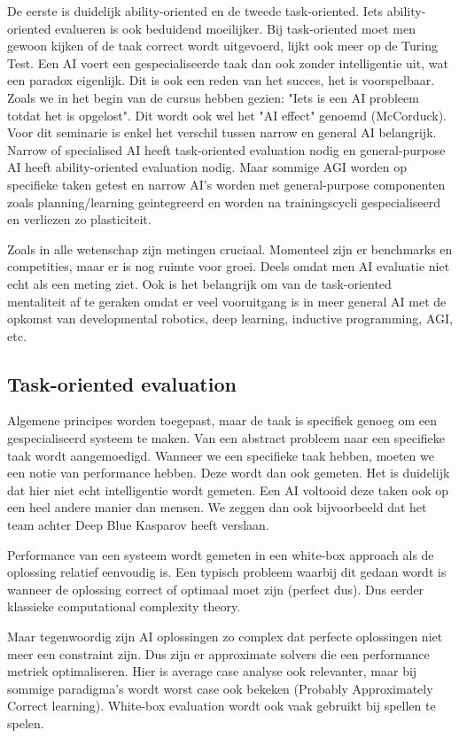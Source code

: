 \documentclass[11pt]{article}
\begin{document}
De eerste is duidelijk ability-oriented en de tweede task-oriented. Iets ability-oriented evalueren is ook beduidend moeilijker. Bij task-oriented moet men gewoon kijken of de taak correct wordt uitgevoerd, lijkt ook meer op de Turing Test. Een AI voert een gespecialiseerde taak dan ook zonder intelligentie uit, wat een paradox eigenlijk. Dit is ook een reden van het succes, het is voorspelbaar. Zoals we in het begin van de cursus hebben gezien: "Iets is een AI probleem totdat het is opgelost". Dit wordt ook wel het "AI effect" genoemd (McCorduck). Voor dit seminarie is enkel het verschil tussen narrow en general AI belangrijk. Narrow of specialised AI heeft task-oriented evaluation nodig en general-purpose AI heeft ability-oriented evaluation nodig. Maar sommige AGI worden op specifieke taken getest en narrow AI's worden met general-purpose componenten zoals planning/learning geintegreerd en worden na trainingscycli gespecialiseerd en verliezen zo plasticiteit.

Zoals in alle wetenschap zijn metingen cruciaal. Momenteel zijn er benchmarks en competities, maar er is nog ruimte voor groei. Deels omdat men AI evaluatie niet echt als een meting ziet. Ook is het belangrijk om van de task-oriented mentaliteit af te geraken omdat er veel vooruitgang is in meer general AI met de opkomst van developmental robotics, deep learning, inductive programming, AGI, etc.

\subsection{Task-oriented evaluation}
\label{sec:org1d14b8e}

Algemene principes worden toegepast, maar de taak is specifiek genoeg om een gespecialiseerd systeem te maken.
Van een abstract probleem naar een specifieke taak wordt aangemoedigd. Wanneer we een specifieke taak hebben, moeten we een notie van performance hebben. Deze wordt dan ook gemeten. Het is duidelijk dat hier niet echt intelligentie wordt gemeten. Een AI voltooid deze taken ook op een heel andere manier dan mensen. We zeggen dan ook bijvoorbeeld dat het team achter Deep Blue Kasparov heeft verslaan.

Performance van een systeem wordt gemeten in een white-box approach als de oplossing relatief eenvoudig is. Een typisch probleem waarbij dit gedaan wordt is wanneer de oplossing correct of optimaal moet zijn (perfect dus). Dus eerder klassieke computational complexity theory.

Maar tegenwoordig zijn AI oplossingen zo complex dat perfecte oplossingen niet meer een constraint zijn. Dus zijn er approximate solvers die een performance metriek optimaliseren. Hier is average case analyse ook relevanter, maar bij sommige paradigma's wordt worst case ook bekeken (Probably Approximately Correct
learning). White-box evaluation wordt ook vaak gebruikt bij spellen te spelen.
\end{document}

